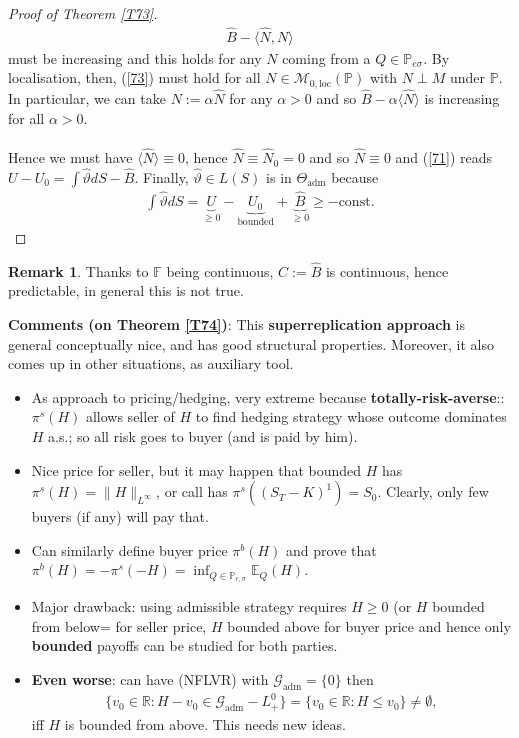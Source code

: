 \documentclass[12pt,a4paper, twoside]{article}
\theoremstyle{definition}
\newtheorem{rem}{Remark}[section]
\newcommand{\EE}{\mathbb{E}} %
\newcommand{\PP}{\mathbb{P}} %
\begin{document}
\begin{proof}[Proof of Theorem \ref{T73}]
\begin{align*} \label{73}
\hat{B}- \langle \hat{N}, N \rangle \tag{7.3}
\end{align*}
must be increasing and this holds for any $N$ coming from a $Q \in \mathbb{P}_{e \sigma}$. By localisation, then, (\ref{73}) must hold for all $N \in \mathcal{M}_{0, \text{loc}}( \PP)$ with $N \perp M$ under $\PP$. In particular, we can take $N:= \alpha \hat{N}$ for any $\alpha >0$ and so $\hat{B}- \alpha \langle \hat{N} \rangle$ is increasing for all $\alpha >0$. \\
\\
Hence we must have $\langle \hat{N} \rangle \equiv 0$, hence $\hat{N} \equiv \hat{N}_0 = 0$ and so $\hat{N} \equiv 0$ and (\ref{71}) reads $U-U_0 = \int \hat{\vartheta}dS - \hat{B}$. Finally, $\hat{\vartheta} \in L(S)$ is in $\Theta_\text{adm}$ because 
\begin{align*}
\int \hat{\vartheta}dS = \underbrace{U}_{ \geq 0}-\underbrace{U_0}_{ \text{bounded}} + \underbrace{\hat{B}}_{ \geq 0} \geq - \text{const}.
\end{align*}
\end{proof}
\begin{rem} Thanks to $\mathbb{F}$ being continuous, $C:= \hat{B}$ is continuous, hence predictable, in general this is not true. 
\end{rem}
\noindent \textbf{Comments (on Theorem \ref{T74})}: This \textbf{superreplication approach} is general conceptually nice, and has good structural properties. Moreover, it also comes up in other situations, as auxiliary tool.
\begin{itemize}
\item As approach to pricing/hedging, very extreme because \textbf{totally-risk-averse}:: $\pi^s(H)$ allows seller of $H$ to find hedging strategy whose outcome dominates $H$ a.s.; so all risk goes to buyer (and is paid by him).
\item Nice price for seller, but it may happen that bounded $H$ has $\pi^s(H) = \| H \|_{L^\infty}$, or call has $\pi^s((S_T-K)^1) = S_0$. Clearly,  only few buyers (if any) will pay that. 
\item Can similarly define buyer price $\pi^b(H)$ and prove that $\pi^b(H) = - \pi^s(-H)= \inf_{Q \in \PP_{e, \sigma}} \EE_Q(H)$. 
\item Major drawback: using admissible strategy requires $H \geq 0$ (or $H$ bounded from below= for seller price, $H$ bounded above for buyer price and hence only \textbf{bounded} payoffs can be studied for both parties.
\item \textbf{Even worse}: can have (NFLVR) with $\mathcal{G}_\text{adm}= \{0\}$ then 
\begin{align*}
\{v_0 \in \mathbb{R}: H-v_0 \in \mathcal{G}_\text{adm}-L_+^0 \} = \{ v_0 \in \mathbb{R}: H \leq v_0 \} \neq \emptyset,
\end{align*}
iff $H$ is bounded from above. This needs new ideas. 
\end{itemize}
\end{document}
